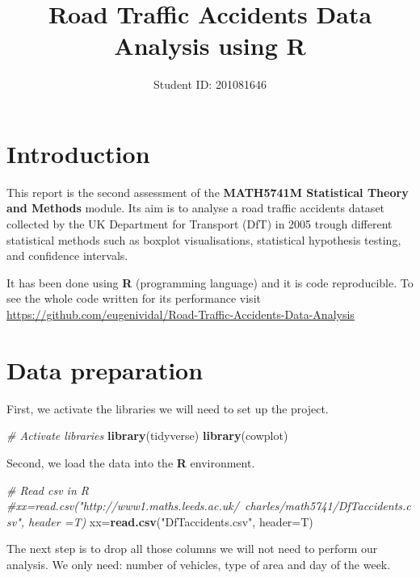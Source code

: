 \documentclass[]{article}
\title{Road Traffic Accidents Data Analysis using R}
\author{Student ID: 201081646}
\date{}
\newenvironment{Shaded}{\begin{snugshade}}{\end{snugshade}}
\newcommand{\KeywordTok}[1]{\textcolor[rgb]{0.13,0.29,0.53}{\textbf{{#1}}}}
\newcommand{\DataTypeTok}[1]{\textcolor[rgb]{0.13,0.29,0.53}{{#1}}}
\newcommand{\StringTok}[1]{\textcolor[rgb]{0.31,0.60,0.02}{{#1}}}
\newcommand{\CommentTok}[1]{\textcolor[rgb]{0.56,0.35,0.01}{\textit{{#1}}}}
\newcommand{\NormalTok}[1]{{#1}}
\begin{document}
\maketitle

\section{Introduction}\label{introduction}

This report is the second assessment of the \textbf{MATH5741M
Statistical Theory and Methods} module. Its aim is to analyse a road
traffic accidents dataset collected by the UK Department for Transport
(DfT) in 2005 trough different statistical methods such as boxplot
visualisations, statistical hypothesis testing, and confidence
intervals.

It has been done using \textbf{R} (programming language) and it is code
reproducible. To see the whole code written for its performance visit
\url{https://github.com/eugenividal/Road-Traffic-Accidents-Data-Analysis}

\section{Data preparation}\label{data-preparation}

First, we activate the libraries we will need to set up the project.

\begin{Shaded}
\begin{Highlighting}[]
\CommentTok{# Activate libraries}
\KeywordTok{library}\NormalTok{(tidyverse)}
\KeywordTok{library}\NormalTok{(cowplot)}
\end{Highlighting}
\end{Shaded}

Second, we load the data into the \textbf{R} environment.

\begin{Shaded}
\begin{Highlighting}[]
\CommentTok{# Read csv in R}
\CommentTok{#xx=read.csv("http://www1.maths.leeds.ac.uk/~charles/math5741/DfTaccidents.csv", header =T)}
\NormalTok{xx=}\KeywordTok{read.csv}\NormalTok{(}\StringTok{"DfTaccidents.csv"}\NormalTok{, }\DataTypeTok{header=}\NormalTok{T)}
\end{Highlighting}
\end{Shaded}

The next step is to drop all those columns we will not need to perform
our analysis. We only need: number of vehicles, type of area and day of
the week.
\end{document}
